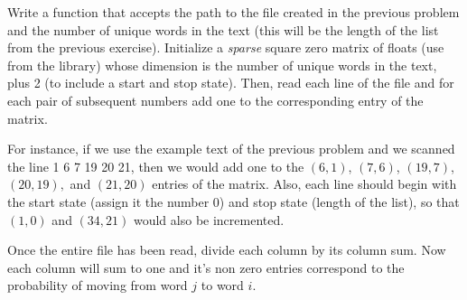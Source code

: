 \begin{problem}
Write a function that accepts the path to the file created in the previous problem and the number of unique words in the text (this will be the length of the list from the previous exercise).
Initialize a \emph{sparse} square zero matrix of floats (use  from the  library) whose dimension is the number of unique words in the text, plus 2 (to include a start and stop state).
Then, read each line of the file and for each pair of subsequent numbers add one to the corresponding entry of the matrix.

For instance, if we use the example text of the previous problem and we scanned the line 1 6 7 19 20 21, then we would add one to the $(6,1)$, $(7,6)$, $(19,7)$, $(20,19),$ and $(21,20)$ entries of the matrix.
Also, each line should begin with the start state (assign it the number 0) and stop state (length of the list), so that $(1,0)$ and $(34,21)$ would also be incremented.

Once the entire file has been read, divide each column by its column sum.
Now each column will sum to one and it's non zero entries correspond to the probability of moving from word $j$ to word $i$.
\end{problem}

\begin{comment}
\subsection*{Starting and Stopping states}

In the previous weather model we chose a fixed number of states to simulate.
However, in English, sentences are of varying length.
One way to simulate this is to create a start state and an end state.
To generate a new sentence, we begin in the given start state.
Subsequent words will have a probability of moving to the end state.
Once the chain has moved to the end state, we have reached the end of the sentence and place a period.
This is modeled in Python with a \li{while} loop and putting the start and stop state as the first and last column of the transition matrix, respectively.
In the following code, we use a multinomial distribution to produce the transitions.

# THIS NEEDS TO BE EXPLAINED IN THE SIMULATING TRANSITIONS SECTION.
# It's explanation is beyond their ken (as in, they don't know what a multinomial distribution
# is.  However, it is the best way I can think of to produce the transitions.
# Maybe put it in a function and give it to them as a black box to be understood later.
\end{comment}

